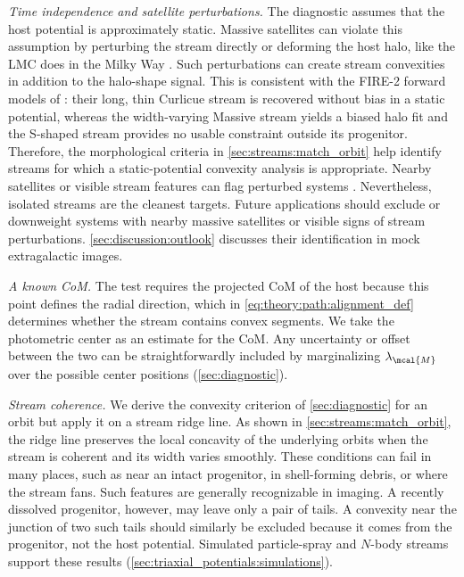 \documentclass[linenumbers,twocolumn]{aastex701}
\newcommand{\lamM}{\ensuremath{\lambda_{\mcal{M}}}}   %
\begin{document}
        \emph{Time independence and satellite perturbations.} %
        The diagnostic assumes that the host potential is approximately static. %
        Massive satellites can violate this assumption by perturbing the stream directly or deforming the host halo, like the \gls{LMC} does in the Milky Way \citep{Erkal+:2019:TotalMassLarge,Shipp+:2021:MeasuringMassLarge,GaravitoCamargo+:2021:QuantifyingImpactLMC,Lilleengen+:2022:EffectDeformingDark,Brooks+:2024:LMCCallsMilkyWay}. %
        Such perturbations can create stream convexities in addition to the halo-shape signal. %
        This is consistent with the FIRE-2 forward models of \citet{Pearson+:2026:ExtragalacticStellarStreams}: their long, thin Curlicue stream is recovered without bias in a static potential, whereas the width-varying Massive stream yields a biased halo fit and the S-shaped stream provides no usable constraint outside its progenitor. %
        Therefore, the morphological criteria in \autoref{sec:streams:match_orbit} help identify streams for which a static-potential convexity analysis is appropriate. %
        Nearby satellites or visible stream features can flag perturbed systems \citep{Dillamore+:2022:ImpactMassiveSagittarius,Foote+:2025:Segue2Recently,Bonaca+:2020:VariationsWidthDensity}. %
        Nevertheless, isolated streams are the cleanest targets. %
        Future applications should exclude or downweight systems with nearby massive satellites or visible signs of stream perturbations. %
        \autoref{sec:discussion:outlook} discusses their identification in mock extragalactic images. %

        \emph{A known \gls{CoM}.} %
        The test requires the projected \gls{CoM} of the host because this point defines the radial direction, which in \cref{eq:theory:path:alignment_def} determines whether the stream contains convex segments. %
        We take the photometric center as an estimate for the \gls{CoM}. %
        Any uncertainty or offset between the two can be straightforwardly included by marginalizing $\lamM$ over the possible center positions (\autoref{sec:diagnostic}). %

        \emph{Stream coherence.} %
        We derive the convexity criterion of \autoref{sec:diagnostic} for an orbit but apply it on a stream ridge line. %
        As shown in \autoref{sec:streams:match_orbit}, the ridge line preserves the local concavity of the underlying orbits when the stream is coherent and its width varies smoothly. %
        These conditions can fail in many places, such as near an intact progenitor, in shell-forming debris, or where the stream fans. %
        Such features are generally recognizable in imaging. %
        A recently dissolved progenitor, however, may leave only a pair of tails. %
        A convexity near the junction of two such tails should similarly be excluded because it comes from the progenitor, not the host potential. %
        Simulated particle-spray and $N$-body streams support these results (\autoref{sec:triaxial_potentials:simulations}).
\end{document}
